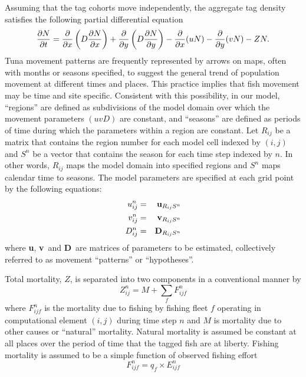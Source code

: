 Assuming that the tag cohorts move independently,
the aggregate tag density satisfies
the following partial differential equation
\begin{equation}
{\partial N \over\partial t}={\partial\over\partial x}\left( D {\partial N \over\partial x}\right) +
                 {\partial\over\partial y}\left( D {\partial N \over\partial y}\right)
                           - {\partial\over\partial x}(u N )
                           - {\partial\over\partial y}(v N )-Z N.
\label{eqn:adrm}
\end{equation}
Tuna movement patterns are frequently
represented by arrows on maps, often with months or seasons specified,
to suggest the general trend of population movement at different
times and places.
This practice implies that fish movement may be time and site specific. 
Consistent with this possibility, in our model,
``regions'' are defined as subdivisions of the model domain over
which the movement parameters $(uvD)$ are constant, and ``seasons''
are defined as periods of time during which the parameters within a region are
constant.  Let $R_{ij}$ be a matrix that contains the region number
for each model cell indexed by $(i,j)$ and $S^n$ be a vector that
contains the season for each time step indexed by $n$.
In other words, $R_{ij}$ maps the model domain into specified regions
and $S^n$ maps calendar time to seasons.
The model parameters are
specified at each grid point by the following equations:
\def\umat{\hbox{\bf u}}
\def\vmat{\hbox{\bf v}}
\def\Dmat{\hbox{\bf D}}
\begin{eqnarray}
   u_{ij}^n& = & \umat_{R_{ij}S^n}\nonumber\\
   v_{ij}^n& = & \vmat_{R_{ij}S^n}\\
   D_{ij}^n& = & \Dmat_{R_{ij}S^n}\nonumber
\end{eqnarray}
where \umat, \vmat\ and \Dmat\ are matrices of parameters to be estimated,
collectively referred to as movement ``patterns'' or ``hypotheses''.

Total mortality, $Z$, is separated into two components in a conventional manner by
\begin{equation}
  Z_{ij}^n = M + \sum_fF_{ijf}^n
\end{equation}
where $F_{ijf}^n$ is the mortality due to
fishing by fishing fleet $f$ operating in computational element $(i,j)$
during time step $n$
and $M$ is mortality due to other causes or ``natural'' mortality.
Natural mortality is assumed be constant at all places over the
period of time that the tagged fish are at liberty.
Fishing mortality is assumed to be a simple function of observed
fishing effort
\begin{equation}
  F_{ijf}^n = q_f\times E_{ijf}^n
\label{eqn:fmort} 
\end{equation}

